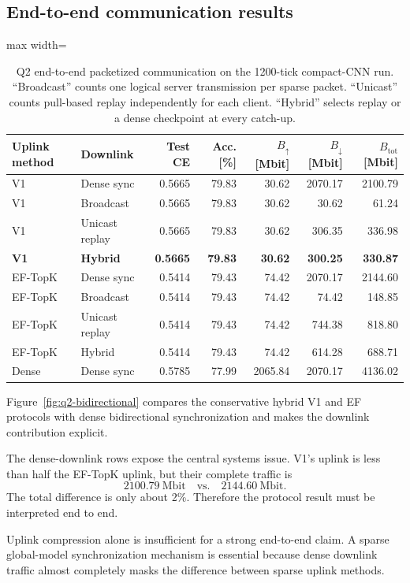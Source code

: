 \subsection{End-to-end communication results}

\begin{table}[ht]
\centering
\small
\caption{Q2 end-to-end packetized communication on the 1200-tick compact-CNN run. ``Broadcast'' counts one logical server transmission per sparse packet. ``Unicast'' counts pull-based replay independently for each client. ``Hybrid'' selects replay or a dense checkpoint at every catch-up.}
\label{tab:q2-end-to-end}
\begin{adjustbox}{max width=\textwidth}
\begin{tabular}{llrrrrr}
\toprule
Uplink method & Downlink & Test CE & Acc. [\%] & $B_\uparrow$ [Mbit] & $B_\downarrow$ [Mbit] & $B_{\mathrm{tot}}$ [Mbit]\\
\midrule
V1 & Dense sync & 0.5665 & 79.83 & 30.62 & 2070.17 & 2100.79\\
V1 & Broadcast & 0.5665 & 79.83 & 30.62 & 30.62 & 61.24\\
V1 & Unicast replay & 0.5665 & 79.83 & 30.62 & 306.35 & 336.98\\
\textbf{V1} & \textbf{Hybrid} & \textbf{0.5665} & \textbf{79.83} & \textbf{30.62} & \textbf{300.25} & \textbf{330.87}\\
\midrule
EF-TopK & Dense sync & 0.5414 & 79.43 & 74.42 & 2070.17 & 2144.60\\
EF-TopK & Broadcast & 0.5414 & 79.43 & 74.42 & 74.42 & 148.85\\
EF-TopK & Unicast replay & 0.5414 & 79.43 & 74.42 & 744.38 & 818.80\\
EF-TopK & Hybrid & 0.5414 & 79.43 & 74.42 & 614.28 & 688.71\\
\midrule
Dense & Dense sync & 0.5785 & 77.99 & 2065.84 & 2070.17 & 4136.02\\
\bottomrule
\end{tabular}
\end{adjustbox}
\end{table}

Figure~\ref{fig:q2-bidirectional} compares the conservative hybrid V1 and EF protocols with dense bidirectional synchronization and makes the downlink contribution explicit.

\QTwoCommunicationFigure

The dense-downlink rows expose the central systems issue. V1's uplink is less than half the EF-TopK uplink, but their complete traffic is
\begin{equation}
2100.79\ \text{Mbit}
\quad\text{vs.}\quad
2144.60\ \text{Mbit}.
\end{equation}
The total difference is only about 2\%. Therefore the protocol result must be interpreted end to end.
\begin{takeawaybox}[title={Q2 systems lesson}]
Uplink compression alone is insufficient for a strong end-to-end claim. A sparse global-model synchronization mechanism is essential because dense downlink traffic almost completely masks the difference between sparse uplink methods.
\end{takeawaybox}

